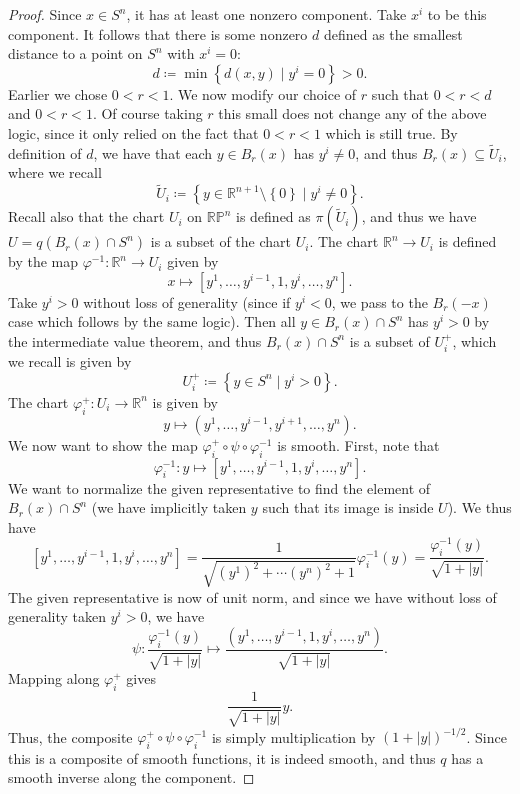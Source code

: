 \documentclass[11pt, letterpaper]{article}
\theoremstyle{plain}
\begin{document}
\begin{proof}
	Since $x\in S^n$, it has at least one nonzero component. Take $x^i$ to be this component. It follows that there is some nonzero $d$ defined as the smallest distance to a point on $S^n$ with $x^i=0$:
	\[
		d\coloneqq \min \left\{ d(x,y)\mid y^i=0 \right\} >0
	.\]
	Earlier we chose $0<r<1$. We now modify our choice of $r$ such that $0<r<d$ and $0<r<1$. Of course taking $r$ this small does not change any of the above logic, since it only relied on the fact that $0<r<1$ which is still true. By definition  of $d$, we have that each $y\in B_r(x)$ has $y^i \neq 0$, and thus $B_r(x)\subseteq \widetilde{U}_i$, where we recall
	\[
		\widetilde{U}_i \coloneqq \left\{ y\in\mathbb{R} ^{n+1} \setminus \left\{ 0 \right\} \mid y^i \neq 0 \right\} 
	.\]
	Recall also that the chart $U_i$ on $\mathbb{R} \mathbb{P} ^n$ is defined as $\pi (\widetilde{U}_i)$, and thus we have $U=q(B_r(x) \cap S^n)$ is a subset of the chart $U_i$. The chart $\mathbb{R} ^{n}  \to U_i$ is defined by the map $\varphi ^{-1} :\mathbb{R} ^n\to U_i$ given by
	\[
		x\mapsto [y^1, \ldots ,y^{i-1} ,1,y^{i} ,\ldots ,y^n].
	\]
	Take $y^i>0$ without loss of generality (since if $y^i<0$, we pass to the $B_r(-x)$ case which follows by the same logic). Then all $y\in B_r(x) \cap S^n$ has $y^i>0$ by the intermediate value theorem, and thus $B_r(x) \cap S^n$ is a subset of $U^+_i$, which we recall is given by
	\[
		U_i^+ \coloneqq \left\{ y\in S^{n} \mid y^i>0 \right\} 
	.\]
	The chart $\varphi^+_i : U_i \to \mathbb{R} ^{n} $ is given by
	\[
		y\mapsto (y^1, \ldots ,y^{i-1} ,y^{i+1} ,\ldots ,y^n)
	.\]
	We now want to show the map $\varphi ^+_i \circ \psi \circ \varphi_i^{-1} $ is smooth. First, note that
	\[
		\varphi _i ^{-1} :y\mapsto [y^1, \ldots ,y^{i-1} ,1,y^{i} ,\ldots ,y^n].
	\]
	We want to normalize the given representative to find the element of $B_r(x) \cap S^n$ (we have implicitly taken $y$ such that its image is inside $U$). We thus have
	\[
		[y^1, \ldots ,y^{i-1} ,1,y^{i} ,\ldots ,y^n]=\frac{1}{\sqrt{(y^1)^2+\cdots (y^n)^2+1} } \varphi _i^{-1} (y)=\frac{\varphi _i^{-1} (y)}{\sqrt{1+\left| y \right| } } 
	.\]
	The given representative is now of unit norm, and since we have without loss of generality taken $y^i>0$, we have
	\[
		\psi : \frac{\varphi_i ^{-1} (y)}{\sqrt{1+\left| y \right| } } \mapsto \frac{(y^1, \ldots ,y^{i-1} ,1,y^{i} ,\ldots ,y^n)}{\sqrt{1+\left| y \right| } } 
	.\]
	Mapping along $\varphi_i^{+} $ gives
	\[
		\frac{1}{\sqrt{1+\left| y \right| } } y
	.\]
	Thus, the composite $\varphi _i^+\circ \psi \circ \varphi_i^{-1} $ is simply multiplication by $\left( 1+\left| y \right|  \right)^{-1/2}  $. Since this is a composite of smooth functions, it is indeed smooth, and thus $q$ has a smooth inverse along the component.
\end{proof}
\end{document}
